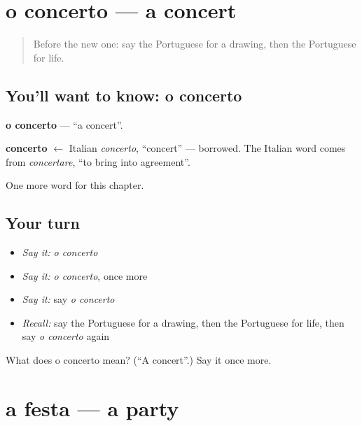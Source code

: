 \section[o concerto]{o concerto — a concert}

\label{lesson:PT-C115-concerto}



\begin{quote}
Before the new one: say the Portuguese for a drawing, then the Portuguese for life.
\end{quote}

\subsection*{You'll want to know: o concerto}
\textbf{o concerto} — \textquotedblleft{}a concert\textquotedblright{}.

\begin{cousinweb}
\textbf{concerto} $\leftarrow$ Italian \emph{concerto}, \textquotedblleft{}concert\textquotedblright{} — borrowed. The Italian word comes from \emph{concertare}, \textquotedblleft{}to bring into agreement\textquotedblright{}.
\end{cousinweb}

\begin{grammarlens}[title={What you've built}]
One more word for this chapter.
\end{grammarlens}

\subsection*{Your turn}
\begin{itemize}
\raggedright
  \item \emph{Say it:} \emph{o concerto}
  \item \emph{Say it:} \emph{o concerto}, once more
  \item \emph{Say it:} say \emph{o concerto}
  \item \emph{Recall:} say the Portuguese for a drawing, then the Portuguese for life, then say \emph{o concerto} again
\end{itemize}

\begin{tcolorbox}[breakable,colback=teal!4,colframe=teal!35!black,title={Before you move on}]
What does o concerto mean? (\textquotedblleft{}A concert\textquotedblright{}.) Say it once more.
\end{tcolorbox}
\section[a festa]{a festa — a party}

